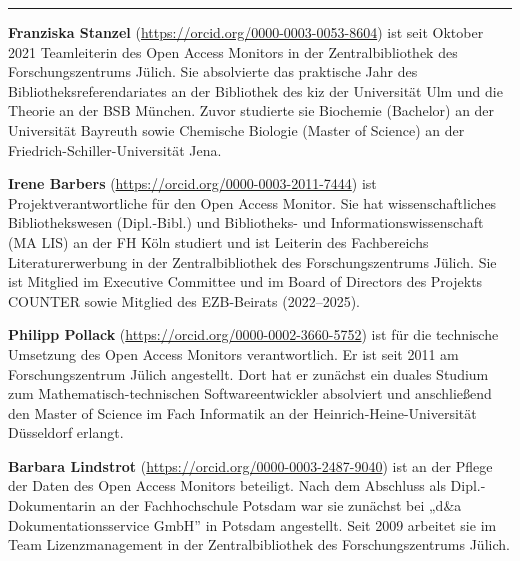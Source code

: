 \begin{center}\rule{0.5\linewidth}{0.5pt}\end{center}

\textbf{Franziska Stanzel} (\url{https://orcid.org/0000-0003-0053-8604})
ist seit Oktober 2021 Teamleiterin des Open Access Monitors in der
Zentralbibliothek des Forschungszentrums Jülich. Sie absolvierte das
praktische Jahr des Bibliotheksreferendariates an der Bibliothek des kiz
der Universität Ulm und die Theorie an der BSB München. Zuvor studierte
sie Biochemie (Bachelor) an der Universität Bayreuth sowie Chemische
Biologie (Master of Science) an der Friedrich-Schiller-Universität Jena.

\textbf{Irene Barbers} (\url{https://orcid.org/0000-0003-2011-7444}) ist
Projektverantwortliche für den Open Access Monitor. Sie hat
wissenschaftliches Bibliothekswesen (Dipl.-Bibl.) und Bibliotheks- und
Informationswissenschaft (MA LIS) an der FH Köln studiert und ist
Leiterin des Fachbereichs Literaturerwerbung in der Zentralbibliothek
des Forschungszentrums Jülich. Sie ist Mitglied im Executive Committee
und im Board of Directors des Projekts COUNTER sowie Mitglied des
EZB-Beirats (2022--2025).

\textbf{Philipp Pollack} (\url{https://orcid.org/0000-0002-3660-5752})
ist für die technische Umsetzung des Open Access Monitors
verantwortlich. Er ist seit 2011 am Forschungszentrum Jülich angestellt.
Dort hat er zunächst ein duales Studium zum Mathematisch-technischen
Softwareentwickler absolviert und anschließend den Master of Science im
Fach Informatik an der Heinrich-Heine-Universität Düsseldorf erlangt.

\textbf{Barbara Lindstrot} (\url{https://orcid.org/0000-0003-2487-9040})
ist an der Pflege der Daten des Open Access Monitors beteiligt. Nach dem
Abschluss als Dipl.-Dokumentarin an der Fachhochschule Potsdam war sie
zunächst bei „d\&a Dokumentationsservice GmbH'' in Potsdam angestellt.
Seit 2009 arbeitet sie im Team Lizenzmanagement in der Zentralbibliothek
des Forschungszentrums Jülich.
